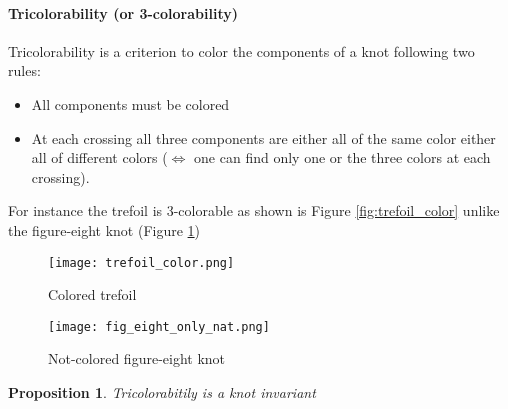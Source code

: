 \documentclass[12pt, a4paper]{article}
\newtheorem{proposition}{Proposition}
\begin{document}
\paragraph{Tricolorability (or 3-colorability)}

Tricolorability is a criterion to color the components of a knot following two rules:

\begin{itemize}
  \item All components must be colored
  \item At each crossing all three components are either all of the same color either all of different colors ($\Longleftrightarrow$ one can find only one or the three colors at each crossing). 
\end{itemize}

For instance the trefoil is 3-colorable as shown is Figure \ref{fig:trefoil_color} unlike the figure-eight knot (Figure \ref{fig:figure8})\\


\begin{figure}[H]
  \begin{minipage}[c]{.4\textwidth}
    \centering
    \texttt{[image: trefoil\_color.png]}
    \caption{Colored trefoil}
    \label{fig:trefoil_color}
  \end{minipage}
  \hfill
  \begin{minipage}[c]{.4\textwidth}
    \centering
    \texttt{[image: fig\_eight\_only\_nat.png]}
    \caption{Not-colored figure-eight knot}
    \label{fig:figure8}
  \end{minipage}  
\end{figure}

\begin{proposition}
  Tricolorabitily is a knot invariant
\end{proposition}
\end{document}
